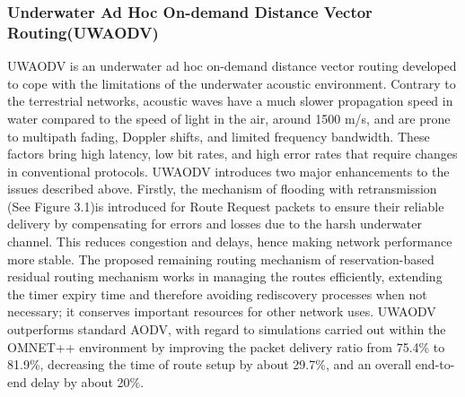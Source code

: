 \documentclass[]{nsm-thesis}
\begin{document}
\subsubsection{Underwater Ad Hoc On-demand Distance Vector Routing(UWAODV)}
UWAODV is an underwater ad hoc on-demand distance vector routing developed to cope with the limitations of the underwater acoustic environment. Contrary to the terrestrial networks, acoustic waves have a much slower propagation speed in water compared to the speed of light in the air, around 1500 m/s, and are prone to multipath fading, Doppler shifts, and limited frequency bandwidth. These factors bring high latency, low bit rates, and high error rates that require changes in conventional protocols. UWAODV introduces two major enhancements to the issues described above. Firstly, the mechanism of flooding with retransmission (See Figure 3.1)is introduced for Route Request packets to ensure their reliable delivery by compensating for errors and losses due to the harsh underwater channel. This reduces congestion and delays, hence making network performance more stable. The proposed remaining routing mechanism of reservation-based residual routing mechanism works in managing the routes efficiently, extending the timer expiry time and therefore avoiding rediscovery processes when not necessary; it conserves important resources for other network uses. UWAODV outperforms standard AODV, with regard to simulations carried out within the OMNET++ environment by improving the packet delivery ratio from 75.4\% to 81.9\%, decreasing the time of route setup by about 29.7\%, and an overall end-to-end delay by about 20\%. \cite{7879681}
\end{document}
